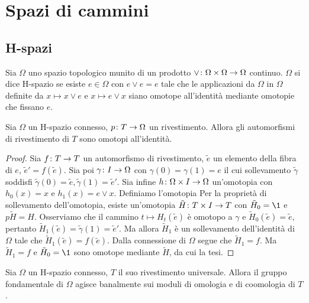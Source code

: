 \chapter{Spazi di cammini}
\section{H-spazi}
\begin{definition}
Sia $\Omega$ uno spazio topologico munito di un prodotto $\vee\colon\Omega\times \Omega\to\Omega$ continuo. $\Omega$ si dice H-spazio se esiste $e\in \Omega$ con $e\vee e=e$ tale che le applicazioni da $\Omega$ in $\Omega$ definite da $x\mapsto x\vee e$ e $x\mapsto e\vee x$ siano omotope all'identità mediante omotopie che fissano $e$.
\end{definition}
\begin{proposition}
Sia $\Omega$ un H-spazio connesso, $p\colon T\to\Omega$ un rivestimento. Allora gli automorfismi di rivestimento di $T$ sono omotopi all'identità.
\end{proposition}
\begin{proof}
Sia $f\colon T\to T$ un automorfismo di rivestimento, $\tilde{e}$ un elemento della fibra di $e$, $\tilde{e}'=f(\tilde{e})$. Sia poi $\gamma\colon I\to\Omega$ con $\gamma(0)=\gamma(1)=e$ il cui sollevamento $\tilde\gamma$ soddisfi $\tilde\gamma(0)=\tilde{e},\tilde\gamma(1)=\tilde{e}'$. Sia infine $h\colon\Omega\times I\to\Omega$ un'omotopia con $h_0(x)=x$ e $h_1(x)=e\vee x$. Definiamo l'omotopia
Per la proprietà di sollevamento dell'omotopia, esiste un'omotopia $\tilde{H}\colon T\times I\to T$ con $\tilde{H}_0=\1$ e $p\tilde{H}=H$. Osserviamo che il cammino $t\mapsto H_t(\tilde{e})$ è omotopo a $\gamma$ e $\tilde{H}_0(\tilde{e})=\tilde{e}$, pertanto $\tilde{H}_1(\tilde{e})=\tilde{\gamma}(1)=\tilde{e}'$. Ma allora $\tilde{H}_1$ è un sollevamento dell'identità di $\Omega$ tale che $\tilde{H}_1(\tilde{e})=f(\tilde{e})$. Dalla connessione di $\Omega$ segue che $\tilde{H}_1=f$. Ma $\tilde{H}_1=f$ e $\tilde{H}_0=\1$ sono omotope mediante $\tilde H$, da cui la tesi.
\end{proof}
\begin{corollary}
Sia $\Omega$ un H-spazio connesso, $T$ il suo rivestimento universale. Allora il gruppo fondamentale di $\Omega$ agisce banalmente sui moduli di omologia e di coomologia di $T$.
\end{corollary}

